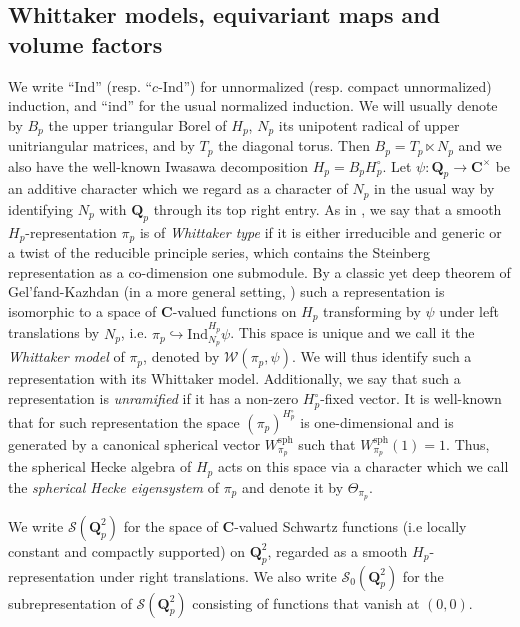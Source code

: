 \documentclass{amsart}%
\theoremstyle{plain}
\theoremstyle{plain}
\theoremstyle{remark}
\begin{document}
\subsection{Whittaker models, equivariant maps and volume factors}\label{sec group schemes eq maps}
We write ``$\mathrm{Ind}$'' (resp. ``$c\text{-}\mathrm{Ind}$'') for unnormalized (resp. compact unnormalized) induction, and ``$\mathrm{ind}$'' for the usual normalized induction.
We will usually denote by $B_p$ the upper triangular Borel of $H_p$, $N_p$ its unipotent radical of upper unitriangular matrices, and by $T_p$ the diagonal torus. Then $B_p=T_p\ltimes N_p$ and we also have the well-known Iwasawa decomposition $H_p=B_pH_p^\circ$.
 Let $\psi:\mathbf{Q}_p\rightarrow \mathbf{C}^\times$ be an additive character which we regard as a character of $N_p$ in the usual way by identifying $N_p$ with $\mathbf{Q}_p$ through its top right entry. As in \cite{loeffler2021gross}, we say that a smooth $H_p$-representation $\pi_p$ is of \textit{Whittaker type} if it is either irreducible and generic or a twist of the reducible principle series, which contains the Steinberg representation as a co-dimension one submodule. By a classic yet deep theorem of Gel'fand-Kazhdan (in a more general setting, \cite{gel1972representation}) such a representation is isomorphic to a space of  $\mathbf{C}$-valued functions on $H_p$ transforming by $\psi$ under left translations by $N_p$, i.e. $\pi_p\hookrightarrow \mathrm{Ind}_{N_p}^{H_p}\psi$. This space is unique and we call it the \textit{Whittaker model} of $\pi_p$, denoted by $\mathcal{W}(\pi_p,\psi)$. We will thus identify such a representation with its Whittaker model. 
Additionally, we say that such a representation is \textit{unramified} if it has a non-zero $H_p^\circ$-fixed vector. It is well-known that for such representation the space $(\pi_p)^{H_p^\circ}$ is one-dimensional and is generated by a canonical spherical vector $W_{\pi_p}^\mathrm{sph}$ such that $W_{\pi_p}^\mathrm{sph}(1)=1$. Thus, the spherical Hecke algebra of $H_p$ acts on this space via a character which we call the \textit{spherical Hecke eigensystem} of $\pi_p$ and denote it by $\Theta_{\pi_p}$.

We write $\mathcal{S}(\mathbf{Q}_p^2)$ for the space of $\mathbf{C}$-valued Schwartz functions (i.e locally constant and compactly supported) on $\mathbf{Q}_p^2$, regarded as a smooth $H_p$-representation under right translations. We also write $\mathcal{S}_0(\mathbf{Q}_p^2)$ for the subrepresentation of $\mathcal{S}(\mathbf{Q}_p^2)$ consisting of functions that vanish at $(0,0)$. 
\end{document}
